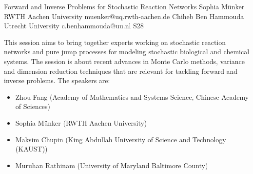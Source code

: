 \begin{session}
 {Forward and Inverse Problems for Stochastic Reaction Networks}%
 {Sophia Münker}%
 {RWTH Aachen University}%
 {muenker@uq.rwth-aachen.de}%
 {Chiheb Ben Hammouda}%
 {Utrecht University}%
 {c.benhammouda@uu.nl}%
 {S28}%
 {}%

 This session aims to bring together experts working on stochastic reaction networks and pure jump processes for modeling stochastic biological and chemical systems. The session is about recent advances in Monte Carlo methods, variance and dimension reduction techniques that are relevant for tackling forward and inverse problems.
 \medskip
 The speakers are:
 \begin{itemize}
 \item Zhou Fang (Academy of Mathematics and Systems Science, Chinese Academy of Sciences)
 \item Sophia Münker (RWTH Aachen University)
 \item Maksim Chupin (King Abdullah University of Science and Technology (KAUST))
 \item Muruhan Rathinam (University of Maryland Baltimore County)
 \end{itemize}
\end{session}



\clearpage

